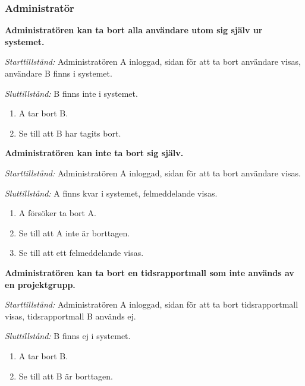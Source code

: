 \documentclass[a4paper]{article}
\begin{document}
\subsubsection{Administratör}
\begin{FT}
\item
\textbf{Administratören kan ta bort alla användare utom sig själv ur systemet.}

\emph{Starttillstånd:} Administratören A inloggad, sidan för att ta bort användare visas, användare B finns i systemet.

\emph{Sluttillstånd:} B finns inte i systemet.

\begin{enumerate}
\item A tar bort B.
\item Se till att B har tagits bort.

\end{enumerate}

\item
\textbf{Administratören kan inte ta bort sig själv.}

\emph{Starttillstånd:} Administratören A inloggad, sidan för att ta bort användare visas.

\emph{Sluttillstånd:} A finns kvar i systemet, felmeddelande visas.

\begin{enumerate}
\item A försöker ta bort A.
\item Se till att A inte är borttagen.
\item Se till att ett felmeddelande visas.
\end{enumerate}

\item
\textbf{Administratören kan ta bort en tidsrapportmall som inte används av en projektgrupp.}

\emph{Starttillstånd:} Administratören A inloggad, sidan för att ta bort tidsrapportmall visas, tidsrapportmall B används ej.

\emph{Sluttillstånd:} B finns ej i systemet.

\begin{enumerate}
\item A tar bort B.
\item Se till att B är borttagen.
\end{enumerate}
\end{FT}
\end{document}
